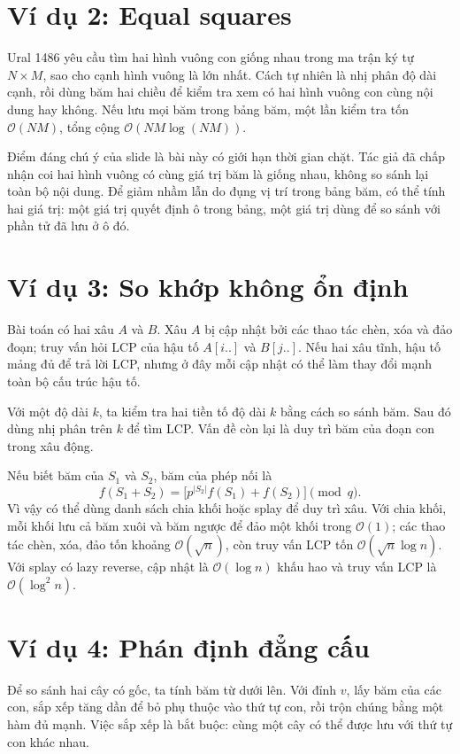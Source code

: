 \documentclass[11pt]{article}
\newcommand{\Oh}{\mathcal{O}}
\begin{document}
\section{Ví dụ 2: Equal squares}

Ural 1486 yêu cầu tìm hai hình vuông con giống nhau trong ma trận ký tự
\(N\times M\), sao cho cạnh hình vuông là lớn nhất. Cách tự nhiên là nhị phân
độ dài cạnh, rồi dùng băm hai chiều để kiểm tra xem có hai hình vuông con
cùng nội dung hay không. Nếu lưu mọi băm trong bảng băm, một lần kiểm tra
tốn \(\Oh(NM)\), tổng cộng \(\Oh(NM\log(NM))\).

Điểm đáng chú ý của slide là bài này có giới hạn thời gian chặt. Tác giả đã
chấp nhận coi hai hình vuông có cùng giá trị băm là giống nhau, không so sánh
lại toàn bộ nội dung. Để giảm nhầm lẫn do đụng vị trí trong bảng băm, có thể
tính hai giá trị: một giá trị quyết định ô trong bảng, một giá trị dùng để so
sánh với phần tử đã lưu ở ô đó.

\section{Ví dụ 3: So khớp không ổn định}

Bài toán có hai xâu \(A\) và \(B\). Xâu \(A\) bị cập nhật bởi các thao tác
chèn, xóa và đảo đoạn; truy vấn hỏi LCP của hậu tố \(A[i..]\) và \(B[j..]\).
Nếu hai xâu tĩnh, hậu tố mảng đủ để trả lời LCP, nhưng ở đây mỗi cập nhật có
thể làm thay đổi mạnh toàn bộ cấu trúc hậu tố.

Với một độ dài \(k\), ta kiểm tra hai tiền tố độ dài \(k\) bằng cách so sánh
băm. Sau đó dùng nhị phân trên \(k\) để tìm LCP. Vấn đề còn lại là duy trì
băm của đoạn con trong xâu động.

Nếu biết băm của \(S_1\) và \(S_2\), băm của phép nối là
\[
  f(S_1+S_2)=\bigl[p^{|S_2|}f(S_1)+f(S_2)\bigr]\pmod q.
\]
Vì vậy có thể dùng danh sách chia khối hoặc splay để duy trì xâu. Với chia
khối, mỗi khối lưu cả băm xuôi và băm ngược để đảo một khối trong \(\Oh(1)\);
các thao tác chèn, xóa, đảo tốn khoảng \(\Oh(\sqrt n)\), còn truy vấn LCP tốn
\(\Oh(\sqrt n\log n)\). Với splay có lazy reverse, cập nhật là \(\Oh(\log n)\)
khấu hao và truy vấn LCP là \(\Oh(\log^2 n)\).

\section{Ví dụ 4: Phán định đẳng cấu}

Để so sánh hai cây có gốc, ta tính băm từ dưới lên. Với đỉnh \(v\), lấy băm
của các con, sắp xếp tăng dần để bỏ phụ thuộc vào thứ tự con, rồi trộn chúng
bằng một hàm đủ mạnh. Việc sắp xếp là bắt buộc: cùng một cây có thể được lưu
với thứ tự con khác nhau.
\end{document}
